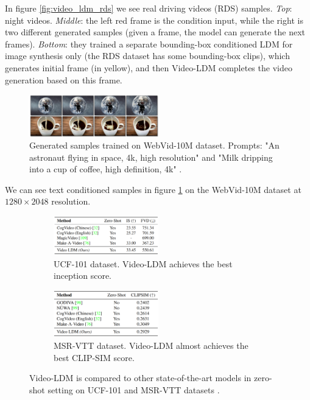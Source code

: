 In figure \ref{fig:video_ldm_rds} we see real driving videos (RDS) samples. \textit{Top}: night videos. \textit{Middle}: the left red frame is the condition input, while the right is two different generated samples (given a frame, the model can generate the next frames). \textit{Bottom}: they trained a separate bounding-box conditioned LDM for image synthesis only (the RDS dataset has some bounding-box clips), which generates initial frame (in yellow), and then Video-LDM completes the video generation based on this frame.

\begin{figure}
    \centering
    \includegraphics[width=0.5\textwidth]{images/video_ldm/webvid_samples.png}
    \caption{Generated samples trained on WebVid-10M dataset. Prompts: "An astronaut flying in space, 4k, high resolution" and "Milk dripping into a cup of coffee, high definition, 4k" \cite{video_ldm}.}
    \label{fig:video_ldm_webvid_samples}
\end{figure}

We can see text conditioned samples in figure \ref{fig:video_ldm_webvid_samples} on the WebVid-10M dataset at $1280\times 2048$ resolution.

\begin{figure}
    \centering

    \begin{subfigure}{0.8\textwidth}
        \centering
        \includegraphics[width=0.5\textwidth]{images/video_ldm/ucf.png}
        \caption{UCF-101 dataset. Video-LDM achieves the best inception score.}
    \end{subfigure}

    \begin{subfigure}{0.8\textwidth}
        \centering
        \includegraphics[width=0.5\textwidth]{images/video_ldm/msr_vtt.png}
        \caption{MSR-VTT dataset. Video-LDM almost achieves the best CLIP-SIM score.}
    \end{subfigure}

    \caption{Video-LDM is compared to other state-of-the-art models in zero-shot setting on UCF-101 and MSR-VTT datasets \cite{video_ldm}.}
\end{figure}

